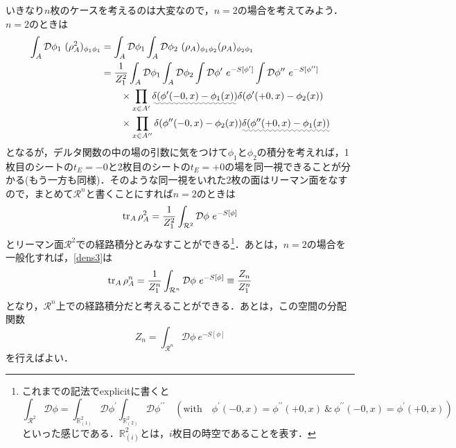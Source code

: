 \documentclass[a4paper,uplatex,dvipdfmx]{jsarticle}
\theoremstyle{definition}
\begin{document}
いきなり$n$枚のケースを考えるのは大変なので，$n=2$の場合を考えてみよう．$n=2$のときは
\begin{align}
  \int_{A}\mathcal{D}\phi_1\ 
  (\rho_{A}^2)_{\phi_1\phi_1}
  &=  
  \int_{A}\mathcal{D}\phi_1
  \int_{A}\mathcal{D}\phi_2\ 
  (\rho_{A})_{\phi_1\phi_2}(\rho_{A})_{\phi_2\phi_1}
  \nonumber
  \\
  &=
  \frac{1}{Z_{1}^2}
  \int_{A}\mathcal{D}\phi_1
  \int_{A}\mathcal{D}\phi_2
  \int\mathcal{D}\phi^{\prime}
  \ 
  e^{-S[\phi^{\prime}]}
  \int\mathcal{D}\phi^{\prime\prime}
  \ 
  e^{-S[\phi^{\prime\prime}]}
  \nonumber
  \\
  &\qquad\times
  \prod_{x\in A^{\prime}}
  \uwave{\delta(\phi^{\prime}(-0,x)-\phi_1(x))}\delta(\phi^{\prime}(+0,x)-\phi_2(x))
  \nonumber
  \\
  &\qquad\times  
  \prod_{x\in A^{\prime\prime}}
  \delta(\phi^{\prime\prime}(-0,x)-\phi_2(x))\uwave{\delta(\phi^{\prime\prime}(+0,x)-\phi_1(x))}
\end{align}
となるが，デルタ関数の中の場の引数に気をつけて$\phi_1$と$\phi_2$の積分を考えれば，1枚目のシートの$t_{E}=-0$と2枚目のシートの$t_{E}=+0$の場を同一視できることが分かる(もう一方も同様)．そのような同一視をいれた2枚の面はリーマン面をなすので，まとめて$\mathcal{R}^{n}$と書くことにすれば$n=2$のときは
\begin{equation}
  \tr_{A}\rho_A^2
  =
  \frac{1}{Z_1^2}
  \int_{\mathcal{R}^2}\mathcal{D}\phi\ 
  e^{-S[\phi]}
\end{equation}
とリーマン面$\mathcal{R}^2$での経路積分とみなすことができる\footnote{
  これまでの記法でexplicitに書くと
  $$
    \int_{\mathcal{R}^2}\mathcal{D}\phi
    =
    \int_{\mathbb{R}^2_{(1)}}\mathcal{D}\phi^{\prime}
    \int_{\mathbb{R}^2_{(2)}}\mathcal{D}\phi^{\prime\prime}
    \quad 
    (
      \text{with}
      \quad
      \phi^{\prime}(-0,x)=\phi^{\prime\prime}(+0,x)\ \&\ \phi^{\prime\prime}(-0,x)=\phi^{\prime}(+0,x)
    )
  $$
  といった感じである．$\mathbb{R}^2_{(i)}$とは，$i$枚目の時空であることを表す．
}．あとは，$n=2$の場合を一般化すれば，\eqref{dens3}は
\begin{equation}
  \tr_{A}\rho_{A}^{n}
  =
  \frac{1}{Z_1^n}
  \int_{\mathcal{R}^{n}}\mathcal{D}\phi\ 
  e^{-S[\phi]}
  \equiv
  \frac{Z_n}{Z_1^{n}}
  \label{sec3_1_eq1}
\end{equation}
となり，$\mathcal{R}^n$上での経路積分だと考えることができる．あとは，この空間の分配関数
\begin{equation}
  Z_n
  =
  \int_{\mathcal{R}^{n}}\mathcal{D}\phi\ 
  e^{-S[\phi]}
\end{equation}
を行えばよい．
\end{document}

